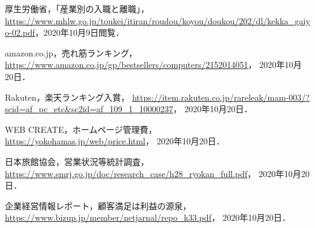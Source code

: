 
\begin{thebibliography}{9}

厚生労働省，「産業別の入職と離職」，\url{https://www.mhlw.go.jp/toukei/itiran/roudou/koyou/doukou/202/dl/kekka_gaiyo-02.pdf}，2020年10月9日閲覧．

amazon.co.jp，売れ筋ランキング，\\
\url{https://www.amazon.co.jp/gp/bestsellers/computers/2152014051}，
2020年10月20日．

Rakuten，楽天ランキング入賞，
\url{https://item.rakuten.co.jp/rareleak/mam-003/?scid=af_pc_etc&sc2id=af_109_1_10000237}，
2020年10月20日．

WEB CREATE，ホームページ管理費，\\
\url{https://yokohamas.jp/web/price.html}，
2020年10月20日．

日本旅館協会，営業状況等統計調査，\\
\url{https://www.smrj.go.jp/doc/research_case/h28_ryokan_full.pdf}，
2020年10月20日．

企業経営情報レポート，顧客満足は利益の源泉，\\
\url{https://www.bizup.jp/member/netjarnal/repo_k33.pdf}，
2020年10月20日．

\end{thebibliography}
